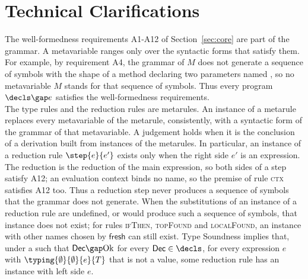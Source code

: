 \section{Technical Clarifications}
\label{sec:clarifications}
The well-formedness requirements A1-A12 of Section~\ref{sec:core} are part of the grammar.
A metavariable ranges only over the syntactic forms that satisfy them.
For example, by requirement A4, the grammar of $M$ does not generate a sequence of symbols with the shape of a method declaring two parameters named \Q@x@, so no metavariable $M$ stands for that sequence of symbols.
Thus every program $\decls\gap e$ satisfies the well-formedness requirements.
\\[1ex]
The type rules and the reduction rules are metarules.
An instance of a metarule replaces every metavariable of the metarule, consistently, with a syntactic form of the grammar of that metavariable.
A judgement holds when it is the conclusion of a derivation built from instances of the metarules.
In particular, an instance of a reduction rule $\step{e}{e'}$ exists only when the right side $e'$ is an expression.
The reduction is the reduction of the main expression, so both sides of a step satisfy A12; an evaluation context binds no name, so the premise of rule \textsc{ctx} satisfies A12 too.
Thus a reduction step never produces a sequence of symbols that the grammar does not generate.
When the substitutions of an instance of a reduction rule are undefined, or would produce such a sequence of symbols, that instance does not exist; for rules \textsc{ifThen}, \textsc{topFound} and \textsc{localFound}, an instance with other names chosen by $\mathsf{fresh}$ can still exist.
Type Soundness implies that, under a \decls such that $\mathsf{Dec}\gap\mathrm{Ok}$ for every $\mathsf{Dec}\in\decls$, for every expression $e$ with $\typing{\emptyset}{\emptyset}{e}{T}$ that is not a value, some reduction rule has an instance with left side $e$.
